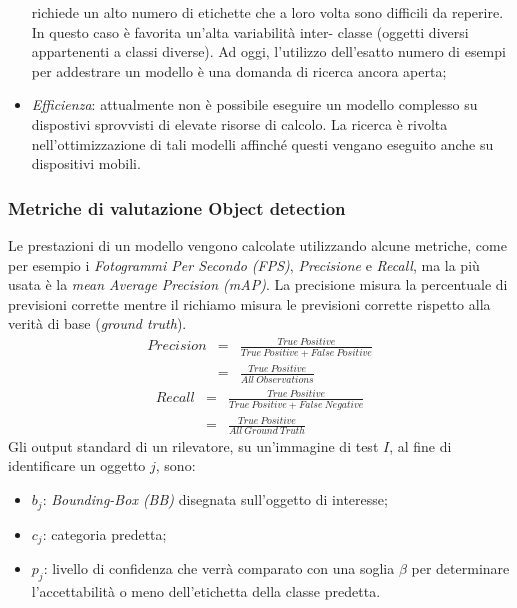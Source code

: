 \begin{itemize}
    richiede un alto numero di etichette che a loro volta sono 
    difficili da reperire. In questo caso è favorita un'alta variabilità inter-
    classe (oggetti diversi appartenenti a classi diverse). Ad oggi, l'utilizzo 
    dell'esatto numero di esempi per addestrare un modello è una domanda 
    di ricerca ancora aperta;
    \item \emph{Efficienza}: attualmente non è possibile eseguire un modello complesso 
    su dispostivi sprovvisti di elevate risorse di calcolo. La ricerca è rivolta 
    nell'ottimizzazione di tali modelli affinché questi vengano eseguito 
    anche su dispositivi mobili.
\end{itemize}

\subsubsection{Metriche di valutazione Object detection}
Le prestazioni di un modello vengono calcolate utilizzando alcune metriche, 
come per esempio i \emph{Fotogrammi Per Secondo (FPS)}, \emph{Precisione} e \emph{Recall}, 
ma la più usata è la \emph{mean Average Precision (mAP)}. La precisione misura 
la percentuale di previsioni corrette mentre il richiamo misura le previsioni 
corrette rispetto alla verità di base (\emph{ground truth}).
\begin{eqnarray}\label{precision}
    Precision & = & \frac{True \ Positive}{True \ Positive + False \ Positive} \nonumber \\
             & = & \frac{True \ Positive}{All \ Observations}
\end{eqnarray}
\begin{eqnarray}\label{recall}
    Recall & = & \frac{True \ Positive}{True \ Positive + False \ Negative} \nonumber \\
             & = & \frac{True \ Positive}{All \ Ground \ Truth}
\end{eqnarray}
Gli output standard di un rilevatore, su un'immagine di test $I$, al fine di 
identificare un oggetto $j$, sono:
\begin{itemize}
    \item $b_j$: \emph{Bounding-Box (BB)} disegnata sull'oggetto di interesse;
    \item $c_j$: categoria predetta;
    \item $p_j$: livello di confidenza che verrà comparato con una soglia $\beta$ per 
    determinare l'accettabilità o meno dell'etichetta della classe predetta. 
\end{itemize}
